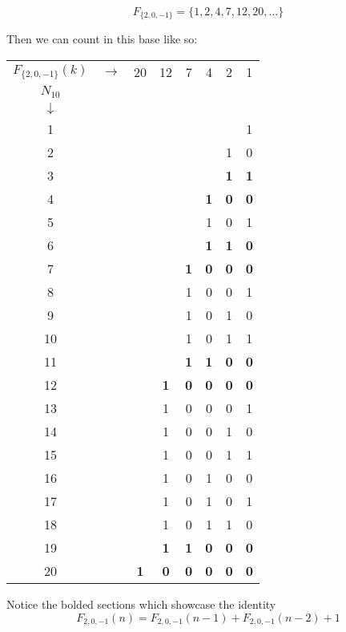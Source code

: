 \documentclass{article}
\begin{document}
\begin{equation}F_{\{2, 0, -1\}} = \{1, 2, 4, 7, 12, 20, ...\}\end{equation}

\noindent Then we can count in this base like so:

\begin{center}
\begin{tabular} {c c c c c c c c}
$F_{\{2, 0, -1\}}(k)$ & $\rightarrow$ & 20 & 12 & 7 & 4 & 2 & 1\\
$N_{10}$\\
$\downarrow$\\
1 & & & & & & & 1\\
2 & & & & & & 1 & 0\\
3 & & & & & & \textbf{1} & \textbf{1}\\
4 & & & & & \textbf{1} & \textbf{0} & \textbf{0}\\
5 & & & & & 1 & 0 & 1\\
6 & & & & & \textbf{1} & \textbf{1} & \textbf{0}\\
7 & & & & \textbf{1} & \textbf{0} & \textbf{0} & \textbf{0}\\
8 & & & & 1 & 0 & 0 & 1\\
9 & & & & 1 & 0 & 1 & 0\\
10& & & & 1 & 0 & 1 & 1\\
11& & & & \textbf{1} & \textbf{1} & \textbf{0} & \textbf{0}\\
12& & & \textbf{1} & \textbf{0} & \textbf{0} & \textbf{0} & \textbf{0}\\
13& & & 1 & 0 & 0 & 0 & 1\\
14& & & 1 & 0 & 0 & 1 & 0\\
15& & & 1 & 0 & 0 & 1 & 1\\
16& & & 1 & 0 & 1 & 0 & 0\\
17& & & 1 & 0 & 1 & 0 & 1\\
18& & & 1 & 0 & 1 & 1 & 0\\
19& & & \textbf{1} & \textbf{1} & \textbf{0} & \textbf{0} & \textbf{0}\\
20& & \textbf{1} & \textbf{0} & \textbf{0} & \textbf{0} & \textbf{0} & \textbf{0}\\
\end{tabular}
\end{center}

\noindent Notice the bolded sections which showcase the identity \begin{equation}F_{2, 0, -1}(n) = F_{2, 0, -1}(n-1) + F_{2, 0, -1}(n-2) + 1\end{equation}
\end{document}
